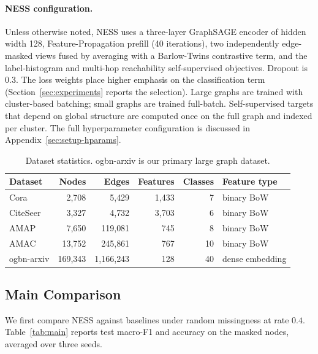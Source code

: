 \paragraph{NESS configuration.} Unless otherwise noted, NESS uses a three-layer GraphSAGE encoder of hidden width 128, Feature-Propagation prefill (40 iterations), two independently edge-masked views fused by averaging with a Barlow-Twins contrastive term, and the label-histogram and multi-hop reachability self-supervised objectives. Dropout is 0.3. The loss weights place higher emphasis on the classification term (Section~\ref{sec:experiments} reports the selection). Large graphs are trained with cluster-based batching; small graphs are trained full-batch. Self-supervised targets that depend on global structure are computed once on the full graph and indexed per cluster. The full hyperparameter configuration is discussed in Appendix~\ref{sec:setup-hparams}.

\begin{table}[t]
\centering
\caption{Dataset statistics. ogbn-arxiv is our primary large graph dataset.}
\label{tab:datasets}
\small
\begin{tabular}{@{}lrrrrl@{}}
\toprule
\textbf{Dataset} & \textbf{Nodes} & \textbf{Edges} & \textbf{Features} & \textbf{Classes} & \textbf{Feature type} \\
\midrule
Cora        & 2{,}708     & 5{,}429       & 1{,}433 & 7 & binary BoW \\
CiteSeer    & 3{,}327     & 4{,}732       & 3{,}703 & 6 & binary BoW \\
AMAP        & 7{,}650     & 119{,}081     & 745     & 8 & binary BoW \\
AMAC        & 13{,}752    & 245{,}861     & 767     & 10 & binary BoW \\
ogbn-arxiv  & 169{,}343   & 1{,}166{,}243 & 128     & 40 & dense embedding \\
\bottomrule
\end{tabular}
\end{table}







\subsection{Main Comparison}
\label{sec:exp-main}

We first compare NESS against baselines under random missingness at rate $0.4$. Table~\ref{tab:main} reports test macro-F1 and accuracy on the masked nodes, averaged over three seeds.

